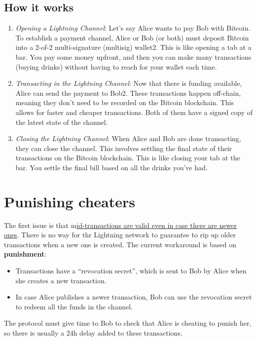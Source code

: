 \subsection{How it works}
\begin{enumerate}


   \item \textit{Opening a Lightning Channel}:
   Let's say Alice wants to pay Bob with Bitcoin. To establish a payment channel, Alice or Bob (or both) must deposit Bitcoin into a 2-of-2 multi-signature (multisig) wallet2. This is like opening a tab at a bar. You pay some money upfront, and then you can make many transactions (buying drinks) without having to reach for your wallet each time.

   \item \textit{Transacting in the Lightning Channel}:
   Now that there is funding available, Alice can send the payment to Bob2. These transactions happen off-chain, meaning they don't need to be recorded on the Bitcoin blockchain. This allows for faster and cheaper transactions.
   Both of them have a signed copy of the latest state of the channel.

   \item \textit{Closing the Lightning Channel}:
   When Alice and Bob are done transacting, they can close the channel. This involves settling the final state of their transactions on the Bitcoin blockchain. This is like closing your tab at the bar. You settle the final bill based on all the drinks you've had.

\end{enumerate}

\section{Punishing cheaters}
The first issue is that m\ul{id-transactions are valid even in case there are newer ones}.
There is no way for thr Lightning network to guarantee to rip up older transactions when a new one is created.
The current workaround is based on \textbf{punishment}:
\begin{itemize}
   \item Transactions have a ``revocation secret'', which is sent to Bob by Alice when she creates a new transaction.
   \item In case Alice publishes a newer transaction, Bob can use the revocation secret to redeem all the funds in the channel.
\end{itemize}
The protocol must give time to Bob to check that Alice is cheating to punish her, so there is usually a 24h delay added to these transactions.

